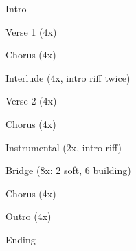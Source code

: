 \documentclass{nnschart}
\begin{document}
\begin{section}{Intro}
\end{section}

\begin{section}{Verse 1 (4x)}
\end{section}

\begin{section}{Chorus (4x)}
\end{section}

\begin{section}{Interlude (4x, intro riff twice)}
\end{section}

\begin{section}{Verse 2 (4x)}
\end{section}

\begin{section}{Chorus (4x)}
\end{section}

\begin{section}{Instrumental (2x, intro riff)}
\end{section}

\begin{section}{Bridge (8x: 2 soft, 6 building)}
\end{section}

\begin{section}{Chorus (4x)}
\end{section}

\begin{section}{Outro (4x)}
\end{section}

\begin{section}{Ending}
\end{section}
\end{document}
